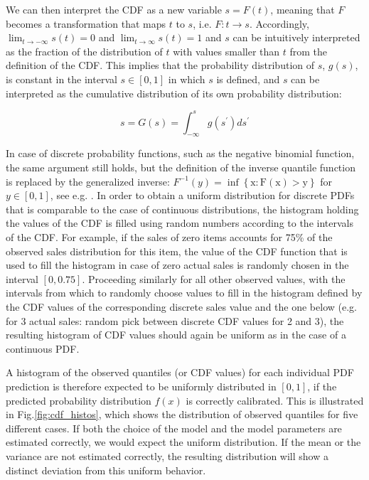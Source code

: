 \documentclass[BCOR=1mm, DIV=calc,10pt,
twoside=true,
twocolumn,
headings=normal]{scrartcl}
\newcommand{\fig}{Fig.}
\begin{document}
We can then interpret the CDF as a new variable $s = F(t)$, meaning that $F$ becomes a transformation that maps $t$ to $s$, i.e. $F:t \to s$. Accordingly,  $\lim_{t \to -\infty}s(t) = 0$ and $\lim_{t \to \infty}s(t) = 1$ and $s$ can be intuitively interpreted as the fraction of the distribution of $t$ with values smaller than $t$ from the definition of the CDF. This implies that the probability distribution of $s$, $g(s)$, is constant in the interval $s \in [0,1]$ in which $s$ is defined, and $s$ can be interpreted as the cumulative distribution of its own probability distribution:

\begin{equation}
s = G(s) = \int_{-\infty}^{s} g(s^\prime) ds^\prime
\end{equation}

In case of discrete probability functions, such as the negative binomial function, the same argument still holds, but the definition of the inverse quantile function is replaced by the generalized inverse: $F^{-1}(y) = \mathrm{\inf \left \{x : F(x)>y\right  \} }$ for $y \in [0,1]$, see e.g. \cite[p. 54]{casella2002statistical}. In order to obtain a uniform distribution for discrete PDFs that is comparable to the case of continuous distributions, the histogram holding the values of the CDF is filled using random numbers according to the intervals of the CDF. For example, if the sales of zero items accounts for 75\% of the observed sales distribution for this item, the value of the CDF function that is used to fill the histogram in case of zero actual sales is randomly chosen in the interval $[0, 0.75]$. Proceeding similarly for all other observed values, with the intervals from which to randomly choose values to fill in the histogram defined by the CDF values of the corresponding discrete sales value and the one below (e.g. for 3 actual sales: random pick between discrete CDF values for 2 and 3), the resulting histogram of CDF values should again be uniform as in the case of a continuous PDF.

A histogram of the observed quantiles (or CDF values) for each individual PDF prediction is therefore expected to be uniformly distributed in $[0,1]$, if the predicted probability distribution $f(x)$ is correctly calibrated. This is illustrated in \fig \ref{fig:cdf_histos}, which shows the distribution of observed quantiles for five different cases. If both the choice of the model and the model parameters are estimated correctly, we would expect the uniform distribution. If the mean or the variance are not estimated correctly, the resulting distribution will show a distinct deviation from this uniform behavior.
\end{document}
